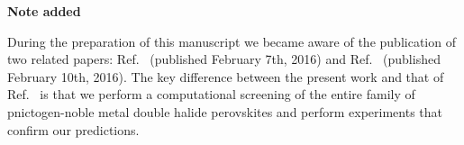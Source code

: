\documentclass[journal=jpcl,manuscript=letter,layout=traditional]{achemso}
\begin{document}
\vspace{0.6cm}

\noindent
 {\large \bf Note added}

\noindent
During the preparation of this manuscript we became aware of the publication of two related papers: Ref.~\cite{Slavney2016} (published
February 7th, 2016) and Ref.~\cite{McClure2016} (published February 10th, 2016). The key difference between the present
work and that of Ref.~\cite{Slavney2016, McClure2016} is that we perform a computational screening of the entire family
of pnictogen-noble metal double halide perovskites and perform experiments that confirm our predictions.

\end{document}
